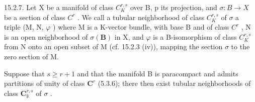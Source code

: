 15.2.7. Let X be a manifold of class \(C_{K}^{r,s}\) over B, p its projection, and \(\sigma: B \to X\) be a section of class \(C^{r}\) . We call a tubular neighborhood of class \(C_{K}^{r,s}\) of \(\sigma\) a triple (M, N, \(\varphi\) ) where M is a K-vector bundle, with base B and of class \(C^{r}\) , N is an open neighborhood of \(\sigma(\mathbf{B})\) in X, and \(\varphi\) is a B-isomorphism of class \(C_{K}^{r,s}\) from N onto an open subset of M (cf. 15.2.3 (iv)), mapping the section \(\sigma\) to the zero section of M.

Suppose that \(s \geqslant r + 1\) and that the manifold B is paracompact and admits partitions of unity of class \(\mathbf{C}^{r}\) (5.3.6); there then exist tubular neighborhoods of class \(\mathbf{C}_{\mathbb{K}}^{r,s}\) of \(\sigma\) .

